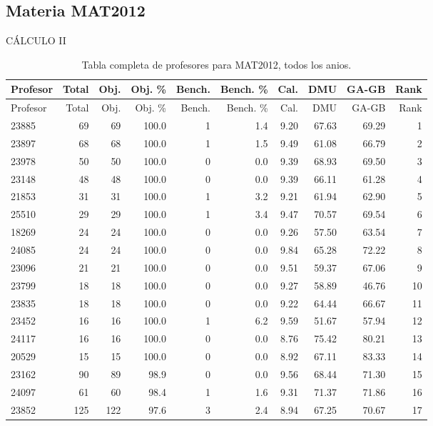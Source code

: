 \subsection{Materia MAT2012}

CÁLCULO II

\begingroup
\scriptsize
\setlength{\tabcolsep}{3pt}
\begin{longtable}{lrrrrrrrrr}
\caption{Tabla completa de profesores para MAT2012, todos los anios.}\label{tab:prof-global-mat2012}\\
\toprule
Profesor & Total & Obj. & Obj. \% & Bench. & Bench. \% & Cal. & DMU & GA-GB & Rank \\
\midrule
\endfirsthead
\toprule
Profesor & Total & Obj. & Obj. \% & Bench. & Bench. \% & Cal. & DMU & GA-GB & Rank \\
\midrule
\endhead
23885 & 69 & 69 & 100.0 & 1 & 1.4 & 9.20 & 67.63 & 69.29 & 1 \\
23897 & 68 & 68 & 100.0 & 1 & 1.5 & 9.49 & 61.08 & 66.79 & 2 \\
23978 & 50 & 50 & 100.0 & 0 & 0.0 & 9.39 & 68.93 & 69.50 & 3 \\
23148 & 48 & 48 & 100.0 & 0 & 0.0 & 9.39 & 66.11 & 61.28 & 4 \\
21853 & 31 & 31 & 100.0 & 1 & 3.2 & 9.21 & 61.94 & 62.90 & 5 \\
25510 & 29 & 29 & 100.0 & 1 & 3.4 & 9.47 & 70.57 & 69.54 & 6 \\
18269 & 24 & 24 & 100.0 & 0 & 0.0 & 9.26 & 57.50 & 63.54 & 7 \\
24085 & 24 & 24 & 100.0 & 0 & 0.0 & 9.84 & 65.28 & 72.22 & 8 \\
23096 & 21 & 21 & 100.0 & 0 & 0.0 & 9.51 & 59.37 & 67.06 & 9 \\
23799 & 18 & 18 & 100.0 & 0 & 0.0 & 9.27 & 58.89 & 46.76 & 10 \\
23835 & 18 & 18 & 100.0 & 0 & 0.0 & 9.22 & 64.44 & 66.67 & 11 \\
23452 & 16 & 16 & 100.0 & 1 & 6.2 & 9.59 & 51.67 & 57.94 & 12 \\
24117 & 16 & 16 & 100.0 & 0 & 0.0 & 8.76 & 75.42 & 80.21 & 13 \\
20529 & 15 & 15 & 100.0 & 0 & 0.0 & 8.92 & 67.11 & 83.33 & 14 \\
23162 & 90 & 89 & 98.9 & 0 & 0.0 & 9.56 & 68.44 & 71.30 & 15 \\
24097 & 61 & 60 & 98.4 & 1 & 1.6 & 9.31 & 71.37 & 71.86 & 16 \\
23852 & 125 & 122 & 97.6 & 3 & 2.4 & 8.94 & 67.25 & 70.67 & 17 \\

\end{longtable}

